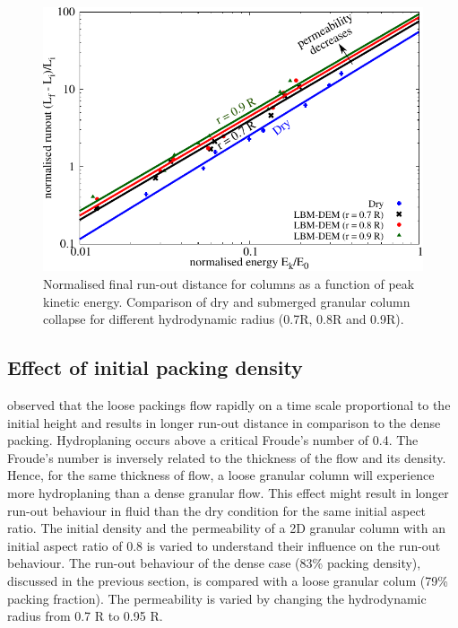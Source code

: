 \begin{landscape}
\begin{figure}
	\centering
	\includegraphics[height=0.9\textheight]{runout_fluid_dry_energy}
	\caption{Normalised final run-out distance for columns as a function of 
	peak kinetic energy. Comparison of dry and submerged granular column 
	collapse for different hydrodynamic radius (0.7R, 0.8R and 0.9R).}
	\label{fig:runout_fluid_dry_energy}
\end{figure}
\end{landscape}



\subsection{Effect of initial packing density}

\citet{Rondon2011} observed that the loose packings flow rapidly on a time
scale proportional to the initial height and results in longer run-out distance 
in comparison to the dense packing. Hydroplaning occurs above a critical 
Froude's number of 0.4. The Froude's number is inversely related to the 
thickness of the flow and its density. Hence, for the same thickness of flow, a 
loose granular column will experience more hydroplaning than a dense granular 
flow. This effect might result in longer run-out behaviour in fluid than the 
dry condition for the same initial aspect ratio. The initial density and the 
permeability of a 2D granular column with an initial aspect ratio of 0.8 is 
varied to understand their influence on the run-out behaviour. The run-out 
behaviour of the dense case (83\% packing density), discussed in the previous 
section, is compared with a loose granular colum (79\% packing fraction). The 
permeability is varied by changing the hydrodynamic radius from 0.7 R to 0.95 
R. 

